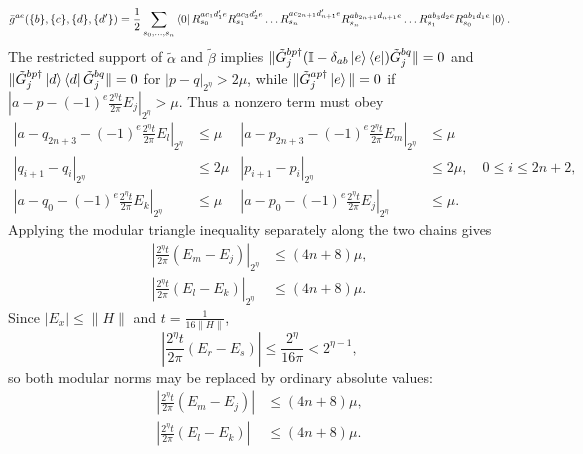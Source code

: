 \documentclass[aps,floatfix,10pt,amssymb,amsfont,amsmath,superscriptaddress,float,nofootinbib,longbibliography,nobalancelastpage,twocolumn]{revtex4-2}
\begin{document}
\begin{widetext}
\begin{equation}
       \bar g^{ae}(\{b\},\{c\},\{d\},\{d'\}) = \frac12\sum_{s_0,\ldots,s_n}
       \bra{0}R_{s_0}^{ac_1d'_1e}R_{s_1}^{ac_3d'_2e}\ldots
       R_{s_n}^{ac_{2n+1}d'_{n+1}e} R_{s_n}^{ab_{2n+1}d_{n+1}e}\ldots
       R_{s_1}^{ab_3d_2e}R_{s_0}^{ab_1d_1e}\ket{0}.
       \label{eq:gbar-definition}
\end{equation}
The restricted support of $\tilde\alpha$ and $\tilde\beta$ implies
$\|\tilde G^{bp\dagger}_{j}(\mathbb{I} - \delta_{ab}\ket{e}\bra{e})\tilde G^{bq}_{j}\| = 0$ and
$\|\tilde G^{bp\dagger}_{j}\ket{d}\bra{d}\tilde G^{bq}_{j}\| = 0$
for $|p-q|_{2^{\eta}} > 2\mu$, while
$\|\tilde G^{ap \dagger}_j \ket{e}\| = 0$ if
$|a-p-(-1)^e\frac{2^{\eta}t}{2\pi}E_j|_{2^\eta}>\mu$.  Thus a nonzero
term must obey
\begin{equation}
\begin{aligned}
    |a-q_{2n+3}-(-1)^e\tfrac{2^{\eta}t}{2\pi}E_l|_{2^{\eta}} &\leq \mu
    &|a-p_{2n+3}-(-1)^e\tfrac{2^{\eta}t}{2\pi}E_m|_{2^{\eta}} &\leq \mu\\
    |q_{i+1}-q_i|_{2^{\eta}} &\leq 2\mu
    &|p_{i+1}-p_i|_{2^{\eta}} &\leq 2\mu,\quad 0\leq i\leq2n+2,\\
    |a-q_0-(-1)^{e}\tfrac{2^{\eta}t}{2\pi}E_k|_{2^{\eta}} &\leq \mu
    &|a-p_0-(-1)^{e}\tfrac{2^{\eta}t}{2\pi}E_j|_{2^{\eta}}& \leq \mu.
\end{aligned}
\end{equation}
Applying the modular triangle inequality separately along the two chains gives
\begin{equation}
\begin{aligned}
    \left|\frac{2^{\eta}t}{2\pi}(E_m-E_j)\right|_{2^{\eta}}&\leq(4n+8)\mu,\\
    \left|\frac{2^{\eta}t}{2\pi}(E_l-E_k)\right|_{2^{\eta}}&\leq(4n+8)\mu.
\end{aligned}
\end{equation}
Since $|E_x|\leq\|H\|$ and $t=\frac{1}{16\|H\|}$,
\begin{equation*}
    \left|\frac{2^{\eta}t}{2\pi}(E_r-E_s)\right|
    \leq \frac{2^{\eta}}{16\pi}<2^{\eta-1},
\end{equation*}
so both modular norms may be replaced by ordinary absolute values:
\begin{equation}
\label{eq:energiessame}
\begin{aligned}
    \left|\frac{2^{\eta}t}{2\pi}(E_m-E_j)\right|&\leq(4n+8)\mu,\\
    \left|\frac{2^{\eta}t}{2\pi}(E_l-E_k)\right|&\leq(4n+8)\mu.
\end{aligned}

\end{equation}
\end{widetext}
\end{document}
